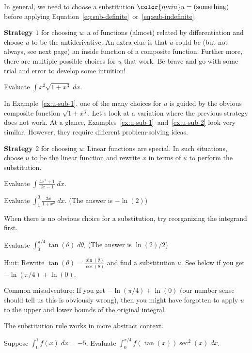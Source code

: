 \documentclass[../main.tex]{subfiles}
\begin{document}
In general, we need to choose a substitution \(\color{main} u = (\text{something})\) before applying Equation~\eqref{eq:sub-definite}~or~\eqref{eq:sub-indefinite}.

\textbf{Strategy \(1\)} for choosing \(u\):  a  of functions (almost) related by differentiation and choose \(u\) to be the antiderivative.  An extra clue is that \(u\) could be (but not always, see next page) an inside function of a composite function. Further more, there are multiple possible choices for \(u\) that work. Be brave and go with some trial and error to develop some intuition!
\begin{example} \label{ex:u-sub-1}
  Evaluate \(\int x^{2} \sqrt{1 + x^{3}} \;dx\).

\end{example}
\clearpage

In Example~\ref{ex:u-sub-1}, one of the many choices for \(u\) is guided by the obvious composite function \(\sqrt{1 + x^{3}}\). Let's look at a variation where the previous strategy does not work. At a glance, Examples~\ref{ex:u-sub-1}~and~\ref{ex:u-sub-2} look very similar. However, they require different problem-solving ideas.

\textbf{Strategy \(2\)} for choosing \(u\): Linear functions are special. In such situations, choose \(u\) to be the linear function and rewrite \(x\) in terms of \(u\) to perform the substitution.
\begin{example} \label{ex:u-sub-2}
  Evaluate \(\int \frac{4x^{2} + 1}{2x - 1} \;dx\).

\end{example}

\begin{example}
  Evaluate \(\int_{1}^{0} \frac{2x}{1 + x^{2}} \;dx\). \hfill{}{(The answer is \(-\ln(2)\))}

\end{example}

\clearpage
When there is no obvious choice for a substitution, try reorganizing the integrand first.
\begin{example}
  Evaluate \(\int_{0}^{\pi/4} \tan(\theta) \;d\theta\). \hfill{}{(The answer is \(\ln(2)/2\))}

  Hint: Rewrite \(\tan(\theta) = \frac{\sin(\theta)}{\cos(\theta)}\) and find a substitution \(u\). See below if you get \(-\ln(\pi/4) + \ln(0)\).

  Common misadventure: If you get \(-\ln(\pi/4) + \ln(0)\) (our number sense should tell us this is obviously wrong), then you might have forgotten to apply \(u\) to the upper and lower bounds of the original integral.
\end{example}

\medskip
The substitution rule works in more abstract context.
\begin{example}
  Suppose \(\int_{0}^{1} f(x) \;dx = -5\). Evaluate \(\int_{0}^{\pi/4} f(\tan(x)) \sec^{2}(x) \;dx\).

\end{example}
\end{document}
